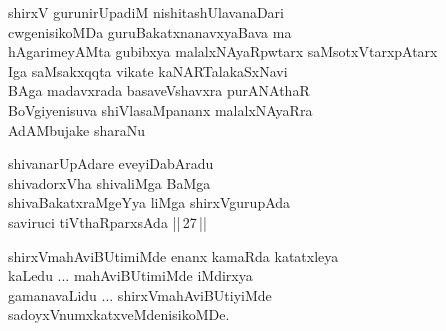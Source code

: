 \begin{entry}
\gl{}
\begin{shl}
shirxV gurunirUpadiM nishitashUlavanaDari\\
cwgenisikoMDa guruBakatxnanavxyaBava ma\\
hAgarimeyAMta gubibxya malalxNAyaRpwtarx saMsotxVtarxpAtarx\\
Iga saMsakxqqta vikate kaNARTalakaSxNavi\\
BAga madavxrada basaveVshavxra purANAthaR\\
BoVgiyenisuva shiVlasaMpananx malalxNAyaRra\\
AdAMbujake sharaNu
\end{shl}
\end{entry}

\begin{entry}
\begin{shl}
shivanarUpAdare eveyiDabAradu\\
shivadorxVha shivaliMga BaMga\\
shivaBakatxraMgeYya liMga shirxVgurupAda\\
saviruci tiVthaRparxsAda ||\,27\,||
\end{shl}
\end{entry}

\begin{entry}
\gl{}
\end{entry}

\begin{entry}
\end{entry}

\begin{entry}
\begin{shl}
shirxVmahAviBUtimiMde enanx kamaRda katatxleya\\
kaLedu ... mahAviBUtimiMde iMdirxya\\
gamanavaLidu ... shirxVmahAviBUtiyiMde\\
sadoyxVnumxkatxveMdenisikoMDe.
\end{shl}
\end{entry}

